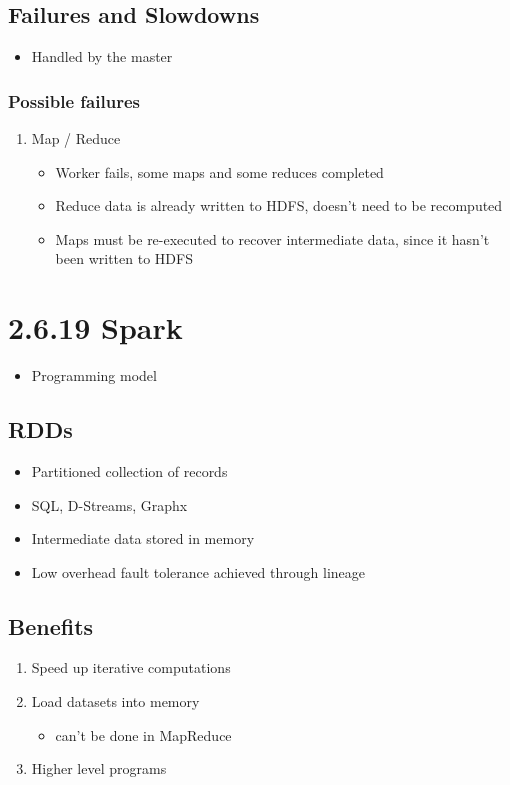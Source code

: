 \documentclass[11pt]{article}
\begin{document}
\subsection{Failures and Slowdowns}
\label{sec:orgheadline3}
\begin{itemize}
\item Handled by the master
\end{itemize}
\subsubsection{Possible failures}
\label{sec:orgheadline2}
\begin{enumerate}
\item Map / Reduce
\begin{itemize}
\item Worker fails, some maps and some reduces completed
\item Reduce data is already written to HDFS, doesn't need to be recomputed
\item Maps must be re-executed to recover intermediate data, since it hasn't been written to HDFS
\end{itemize}
\end{enumerate}


\section{2.6.19 Spark}
\label{sec:orgheadline8}
\begin{itemize}
\item Programming model
\end{itemize}

\subsection{RDDs}
\label{sec:orgheadline5}
\begin{itemize}
\item Partitioned collection of records
\item SQL, D-Streams, Graphx
\item Intermediate data stored in memory
\item Low overhead fault tolerance achieved through lineage
\end{itemize}

\subsection{Benefits}
\label{sec:orgheadline6}
\begin{enumerate}
\item Speed up iterative computations
\item Load datasets into memory
\begin{itemize}
\item can't be done in MapReduce
\end{itemize}

\item Higher level programs
\end{enumerate}
\end{document}
